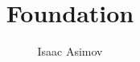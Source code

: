 \documentclass[tgheros,headers,manuscript,11pt]{salford}
\author{Isaac Asimov}
\title{Foundation}
\theoremstyle{definition}
\begin{document}
\linenumbers %

\frontmatter








\mainmatter



% 
%
%


\backmatter




\appendix


\end{document}
